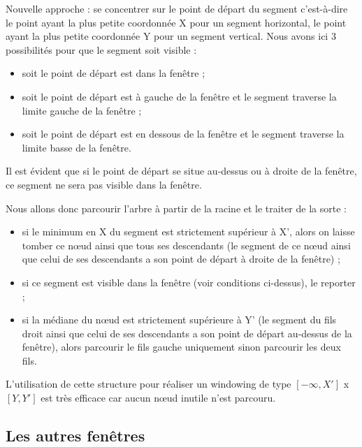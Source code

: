 \documentclass[10pt,a4paper]{article}
\begin{document}
Nouvelle approche : se concentrer sur le point de départ du segment c'est-à-dire le point ayant la plus petite coordonnée X pour un segment horizontal, le point ayant la plus petite coordonnée Y pour un segment vertical. Nous avons ici 3 possibilités pour que le segment soit visible :
\begin{itemize}
	\item soit le point de départ est dans la fenêtre ;
	\item soit le point de départ est à gauche de la fenêtre et le segment traverse la limite gauche de la fenêtre ;
	\item soit le point de départ est en dessous de la fenêtre et le segment traverse la limite basse de la fenêtre.
\end{itemize}
Il est évident que si le point de départ se situe au-dessus ou à droite de la fenêtre, ce segment ne sera pas visible dans la fenêtre.

Nous allons donc parcourir l'arbre à partir de la racine et le traiter de la sorte :
\begin{itemize}
	\item si le minimum en X du segment est strictement supérieur à X', alors on laisse tomber ce nœud ainsi que tous ses descendants (le segment de ce nœud ainsi que celui de ses descendants a son point de départ à droite de la fenêtre) ;
	\item si ce segment est visible dans la fenêtre (voir conditions ci-dessus), le reporter ;
	\item si la médiane du nœud est strictement supérieure à Y' (le segment du fils droit ainsi que celui de ses descendants a son point de départ au-dessus de la fenêtre), alors parcourir le fils gauche uniquement sinon parcourir les deux fils.
\end{itemize}

L'utilisation de cette structure pour réaliser un windowing de type $[-\infty, X']$ x $[Y, Y']$ est très efficace car aucun nœud inutile n'est parcouru.


\subsection{Les autres fenêtres}
\end{document}
